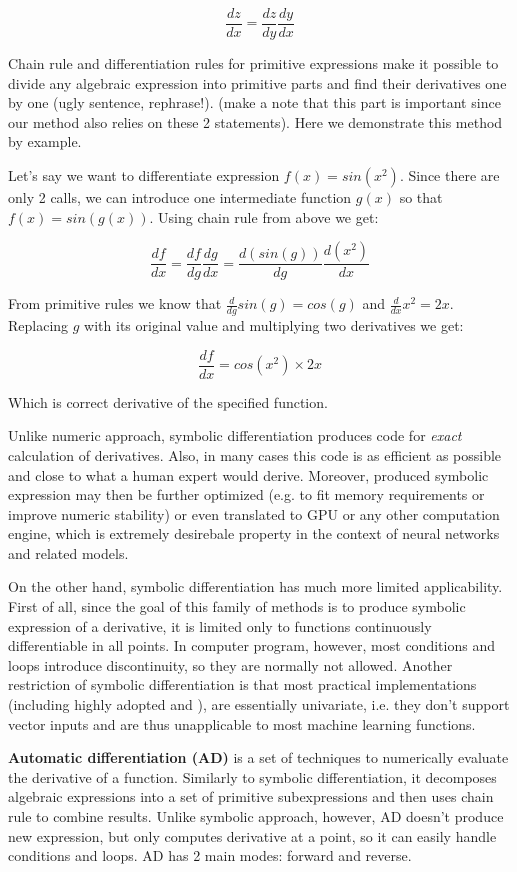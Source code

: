 \documentclass[conference]{IEEEtran}
\begin{document}
$$\frac{dz}{dx} = \frac{dz}{dy}\frac{dy}{dx}$$

Chain rule and differentiation rules for primitive expressions make it possible to divide any algebraic expression into primitive parts and find their derivatives one by one (ugly sentence, rephrase!). (make a note that this part is important since our method also relies on these 2 statements). Here we demonstrate this method by example. 

Let's say we want to differentiate expression $f(x) = sin(x^2)$. Since there are only 2 calls, we can introduce one intermediate function $g(x)$ so that $f(x) = sin(g(x))$. Using chain rule from above we get: 

$$\frac{df}{dx} = \frac{df}{dg}\frac{dg}{dx} = \frac{d(sin(g))}{dg}\frac{d(x^2)}{dx}$$

From primitive rules we know that $\frac{d}{dg}sin(g) = cos(g)$ and $\frac{d}{dx}x^2 = 2x$. Replacing $g$ with its original value and multiplying two derivatives we get: 

$$\frac{df}{dx} = cos(x^2) \times 2x$$

Which is correct derivative of the specified function. 

Unlike numeric approach, symbolic differentiation produces code for \textit{exact} calculation of derivatives. Also, in many cases this code is as efficient as possible and close to what a human expert would derive. Moreover, produced symbolic expression may then be further optimized (e.g. to fit memory requirements or improve numeric stability) or even translated to GPU or any other computation engine, which is extremely desirebale property in the context of neural networks and related models.

On the other hand, symbolic differentiation has much more limited applicability. First of all, since the goal of this family of methods is to produce symbolic expression of a derivative, it is limited only to functions continuously differentiable in all points. In computer program, however, most conditions and loops introduce discontinuity, so they are normally not allowed. Another restriction of symbolic differentiation is that most practical implementations (including highly adopted \cite{SymPy} and \cite{Mathematica}), are essentially univariate, i.e. they don't support vector inputs and are thus unapplicable to most machine learning functions.

\textbf{Automatic differentiation (AD)} is a set of techniques to numerically evaluate the derivative of a function. Similarly to symbolic differentiation, it decomposes algebraic expressions into a set of primitive subexpressions and then uses chain rule to combine results. Unlike symbolic approach, however, AD doesn't produce new expression, but only computes derivative at a point, so it can easily handle conditions and loops. AD has 2 main modes: forward and reverse.
\end{document}
